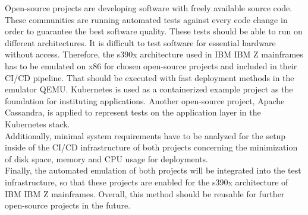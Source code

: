 Open-source projects are developing software with freely available source code. These communities are running automated tests against every code change in order to guarantee the best software quality. 
These tests should be able to run on different architectures. It is difficult to test software for essential hardware without access. Therefore, the \gls{s390x} architecture used in IBM \gls{IBM Z mainframes} has to be emulated on x86 for chosen open-source projects and included in their \gls{CI/CD} pipeline. 
That should be executed with fast deployment methods in the \gls{emulator} QEMU. 
Kubernetes is used as a \gls{containerized} example project as the foundation for instituting applications. Another open-source project, Apache Cassandra, is applied to represent tests on the \gls{application layer} in the Kubernetes stack. \\
Additionally, minimal system requirements have to be analyzed for the setup inside of the CI/CD infrastructure of both projects concerning the minimization of disk space, memory and CPU usage for deployments. \\
Finally, the automated emulation of both projects will be integrated into the test infrastructure, so that these projects are enabled for the s390x architecture of IBM IBM Z mainframes. Overall, this method should be reusable for further open-source projects in the future.


